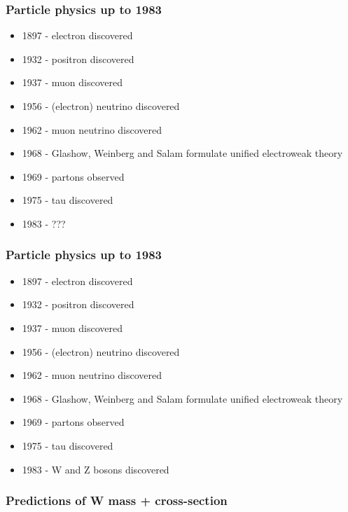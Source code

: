 \documentclass[xcolor=table]{beamer}
\begin{document}
\begin{frame}
\frametitle{Particle physics up to 1983}
\fontsize{9pt}{12}\selectfont

\begin{itemize}
\item 1897 - electron discovered
\item 1932 - positron discovered
\item 1937 - muon discovered
\item 1956 - (electron) neutrino discovered
\item 1962 - muon neutrino discovered
\item 1968 - Glashow, Weinberg and Salam formulate unified electroweak theory
\item 1969 - partons observed
\item 1975 - tau discovered
\item 1983 - ???
\end{itemize}


\end{frame}

\begin{frame}
\frametitle{Particle physics up to 1983}
\fontsize{9pt}{12}\selectfont

\begin{itemize}
\item 1897 - electron discovered
\item 1932 - positron discovered
\item 1937 - muon discovered
\item 1956 - (electron) neutrino discovered
\item 1962 - muon neutrino discovered
\item 1968 - Glashow, Weinberg and Salam formulate unified electroweak theory
\item 1969 - partons observed
\item 1975 - tau discovered
\item 1983 - W and Z bosons discovered
\end{itemize}


\end{frame}


\begin{frame}
\frametitle{Predictions of W mass + cross-section}



\end{frame}


\end{document}
